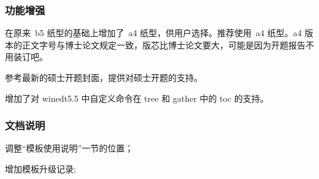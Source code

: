 \subsubsection{功能增强}
\begin{hitlist}
  \item 在原来~b5 纸型的基础上增加了~a4 纸型，供用户选择。推荐使用~a4 纸型。a4 版本的正文字号与博士论文规定一致，版芯比博士论文要大，可能是因为开题报告不用装订吧。
  \item 参考最新的硕士开题封面，提供对硕士开题的支持。
  \item 增加了对 winedt5.5 中自定义命令在 tree 和 gather 中的 toc 的支持。
\end{hitlist}


\subsubsection{文档说明}
 \begin{hitlist}
   \item 调整``模板使用说明''一节的位置；
   \item 增加模板升级记录;
 \end{hitlist} 